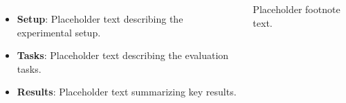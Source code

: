 \documentclass[25pt, margin=0.5in, innermargin=0pt, blockverticalspace=0.4in, colspace=0.5in]{tikzposter}
\newlength{\rowoneheight}
\begin{document}
\begin{columns}
{\begin{minipage}[t][\rowoneheight][t]{\linewidth}
            \begin{itemize}
                \item \textbf{Setup}: Placeholder text describing the experimental setup.
                \item \textbf{Tasks}: Placeholder text describing the evaluation tasks.
                \item \textbf{Results}: Placeholder text summarizing key results.
            \end{itemize}
            \vspace{0.2cm}
            \vspace{0.3cm}

            {\large Placeholder footnote text.}
            \par\vspace*{\fill}%
        \end{minipage}
    }

\end{columns}
\end{document}
